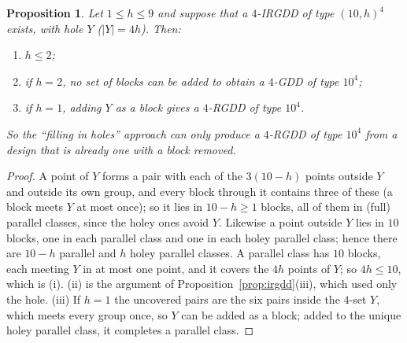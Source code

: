 \documentclass[11pt]{article}
\newtheorem{proposition}[theorem]{Proposition}
\theoremstyle{remark}
\begin{document}
\begin{proposition}\label{prop:holes}
Let $1\le h\le 9$ and suppose that a $4$-IRGDD of type $(10,h)^{4}$ exists, with hole $Y$
($|Y|=4h$).  Then:
\begin{enumerate}
\item[(i)] $h\le 2$;
\item[(ii)] if $h=2$, no set of blocks can be added to obtain a $4$-GDD of type $10^{4}$;
\item[(iii)] if $h=1$, adding $Y$ as a block gives a $4$-RGDD of type $10^{4}$.
\end{enumerate}
So the ``filling in holes'' approach can only produce a $4$-RGDD of type $10^{4}$ from a
design that is already one with a block removed.
\end{proposition}

\begin{proof}
A point of $Y$ forms a pair with each of the $3(10-h)$ points outside $Y$ and outside its
own group, and every block through it contains three of these (a block meets $Y$ at most
once); so it lies in $10-h\ge 1$ blocks, all of them in (full) parallel classes, since
the holey ones avoid $Y$.  Likewise a point outside $Y$ lies in $10$ blocks, one in each
parallel class and one in each holey parallel class; hence there are $10-h$ parallel and
$h$ holey parallel classes.  A parallel class has $10$ blocks, each meeting $Y$ in at most
one point, and it covers the $4h$ points of $Y$; so $4h\le 10$, which is (i).
(ii) is the argument of Proposition~\ref{prop:irgdd}(iii), which used only the hole.
(iii) If $h=1$ the uncovered pairs are the six pairs inside the $4$-set $Y$, which meets
every group once, so $Y$ can be added as a block; added to the unique holey parallel
class, it completes a parallel class.
\end{proof}
\end{document}
